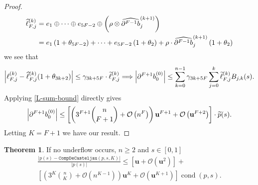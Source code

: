 \documentclass[3p, authoryear, square]{elsarticle}
\theoremstyle{definition}
\newtheorem{theorem}{Theorem}[section]
\newcommand{\cond}[1]{\operatorname{cond}\left(#1\right)}
\newcommand{\bigO}[1]{\mathcal{O}\left(#1\right)}
\newcommand{\mach}{\mathbf{u}}
\newcommand{\db}[1]{
  \ifthenelse{\equal{#1}{1}}
             {\partial b}
             {\partial^{#1} b}
}
\newcommand{\cdb}[1]{
  \ifthenelse{\equal{#1}{1}}
             {\widehat{\partial b}}
             {\widehat{\partial^{#1} b}}
}
\begin{document}
\begin{proof}
\begin{align}
\widehat{\ell}_{F, j}^{(k)} &= e_1 \oplus \cdots \oplus e_{5F - 2} \oplus
\left(\rho \otimes \cdb{F - 1}_j^{(k + 1)}\right) \\
&= e_1\left(1 + \theta_{5F - 2}\right) + \cdots +
e_{5F - 2}\left(1 + \theta_2\right) +
\rho \cdot \cdb{F - 1}_j^{(k + 1)} \left(1 + \theta_2\right)
\end{align}
we see that
\begin{equation}
\left|\ell_{F, j}^{(k)} -
\widehat{\ell}_{F, j}^{(k)} (1 + \theta_{3k + 2})\right| \leq
\gamma_{3k + 5F} \cdot \widetilde{\ell}_{F, j}^{(k)}
\Longrightarrow
\left|\db{F + 1}_0^{(0)}\right| \leq \sum_{k = 0}^{n - 1}
\gamma_{3k + 5F} \sum_{j = 0}^k \widetilde{\ell}_{F, j}^{(k)} B_{j, k}(s).
\end{equation}
Applying \eqref{L-sum-bound} directly gives
\begin{equation}
\left|\db{F + 1}_0^{(0)}\right| \leq
  \left[\left(3^{F + 1} \binom{n}{F + 1} + \bigO{n^F}\right)
  \mach^{F + 1} + \bigO{\mach^{F + 2}}\right] \cdot \widetilde{p}(s).
\end{equation}
Letting \(K = F + 1\) we have our result.
\end{proof}

\begin{theorem}
If no underflow occurs, \(n \geq 2\) and \(s \in \left[0, 1\right]\)
\begin{multline}
  \frac{\left|p(s) - \mathtt{CompDeCasteljau}(p, s, K)\right|}{
    \left|p(s)\right|} \leq \left[\mach + \bigO{\mach^2}
    \right] + \\
    \left[\left(3^{K} \binom{n}{K} + \bigO{n^{K - 1}}\right) \mach^K +
    \bigO{\mach^{K + 1}}\right] \cond{p, s}.
\end{multline}
\end{theorem}
\end{document}
